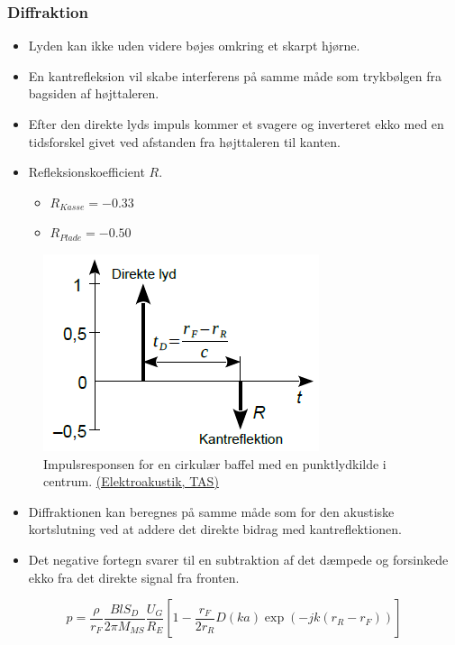 \subsubsection{Diffraktion}
\begin{itemize}
	\item Lyden kan ikke uden videre bøjes omkring et skarpt hjørne. 
	\item En kantrefleksion vil	skabe interferens på samme måde som trykbølgen fra bagsiden af højttaleren.
	\item Efter den direkte lyds impuls kommer et svagere og inverteret ekko med en tidsforskel givet ved afstanden fra højttaleren til kanten.
	\item Refleksionskoefficient $R$.
	\begin{itemize}
		\item $R_{Kasse} =−0.33$
		\item $R_{Plade} =−0.50$
	\end{itemize}
\end{itemize}

\begin{figure} [H]
	\centering
	\includegraphics[width=0.5\linewidth]{graphics/54.png}
	\caption{Impulsresponsen for en cirkulær baffel med en punktlydkilde i centrum. \href{http://www.torean.dk/artikel/Elektroakustik.pdf}{(Elektroakustik, TAS)}}
	\label{fig:54}
\end{figure}

\begin{itemize}
	\item Diffraktionen kan beregnes på samme måde som for den akustiske kortslutning ved at addere det direkte bidrag med kantreflektionen.
	\item Det negative fortegn svarer til en subtraktion af det dæmpede og forsinkede ekko fra det direkte signal fra fronten.
\end{itemize}

\begin{equation}
p = \dfrac{\rho}{r_F}\dfrac{Bl S_D}{2\pi M_{MS}}\dfrac{U_G}{R_E}\left[1-\dfrac{r_F}{2r_R}D(ka)\exp(-jk(r_R-r_F))\right]
\end{equation}

